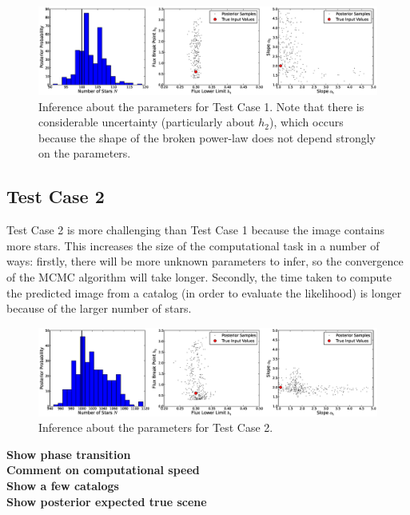 \documentclass[manuscript]{aastex}
\begin{document}
\begin{figure}
\begin{center}
\includegraphics[scale=0.33]{Figures/inference1.eps}
\end{center}
\caption{Inference about the parameters for Test Case 1. Note that there is
considerable uncertainty (particularly about $h_2$), which occurs because the
shape of the broken power-law does not depend strongly on the parameters.
\label{fig:results1}}
\end{figure}

\subsection{Test Case 2}
Test Case 2 is more challenging than Test Case 1 because the image contains
more stars. This increases the size of the computational task in a number of
ways: firstly, there will be more unknown parameters to infer, so the
convergence of the MCMC algorithm will take longer. Secondly, the time taken
to compute the predicted image from a catalog (in order to evaluate the
likelihood) is longer because of the larger number of stars.

\begin{figure}
\begin{center}
\includegraphics[scale=0.33]{Figures/inference2.eps}
\end{center}
\caption{Inference about the parameters for Test Case 2.\label{fig:results2}}
\end{figure}

{\bf Show phase transition}\\
{\bf Comment on computational speed}\\
{\bf Show a few catalogs}\\
{\bf Show posterior expected true scene}\\
\end{document}
